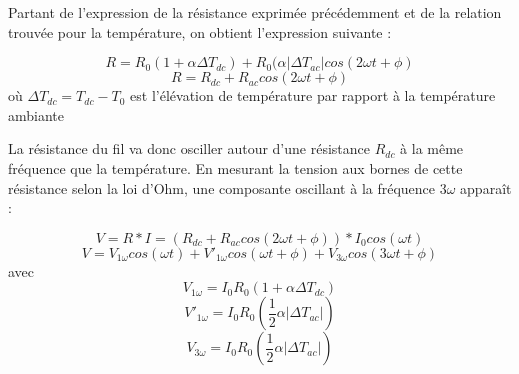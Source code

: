 \documentclass[10pt,a4paper]{report}
\begin{document}
Partant de l’expression de la résistance exprimée précédemment et de la relation trouvée pour la température, on obtient l’expression suivante :
\begin{center}
\begin{equation}
R=R_{0}(1+\alpha \Delta T_{dc})+R_{0}(\alpha \lvert \Delta T_{ac} \rvert cos(2\omega t+\phi)
\end{equation}
\begin{equation}
R=R_{dc}+R_{ac}cos(2\omega t+\phi)
\end{equation}
où $\Delta T_{dc}=T_{dc}-T_{0}$ est l'élévation de température par rapport à la température ambiante
\end{center}
La résistance du fil va donc osciller autour d’une résistance $R_{dc}$ à la même fréquence que la température. En mesurant la tension aux bornes de cette résistance selon la loi d’Ohm, une composante oscillant à la fréquence 3$\omega$ apparaît :
\begin{center}
\begin{equation}
V=R*I=(R_{dc}+R_{ac}cos(2\omega t+\phi))*I_{0}cos(\omega t)
\end{equation}
\begin{equation}
V=V_{1\omega}cos(\omega t)+V'_{1\omega}cos(\omega t+\phi)+V_{3\omega}cos(3\omega t+\phi)
\end{equation}
avec
\begin{equation}
V_{1\omega}=I_{0}R_{0}(1+\alpha \Delta T_{dc})
\end{equation}
\begin{equation}
V'_{1\omega}=I_{0}R_{0}(\frac{1}{2}\alpha \lvert \Delta T_{ac} \rvert)
\end{equation}
\begin{equation}
V_{3\omega}=I_{0}R_{0}(\frac{1}{2}\alpha \lvert \Delta T_{ac} \rvert)
\end{equation}
\end{center}
\end{document}
